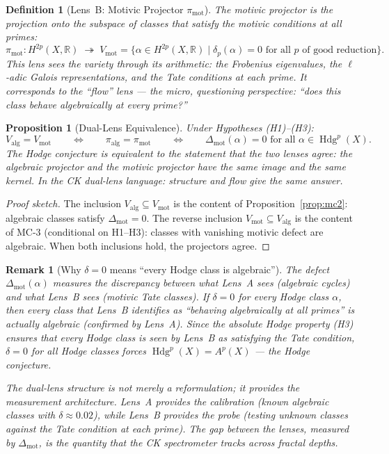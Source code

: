 \documentclass[11pt]{article}
\newtheorem{proposition}[theorem]{Proposition}
\newtheorem{definition}[theorem]{Definition}
\newtheorem{remark}[theorem]{Remark}
\theoremstyle{definition}
\DeclareMathOperator{\Hdg}{Hdg}
\begin{document}
\begin{definition}[Lens~B: Motivic Projector $\pi_{\mathrm{mot}}$]
\label{def:lens-B}
The \emph{motivic projector} is the projection onto the subspace of classes
that satisfy the motivic conditions at all primes:
\[
  \pi_{\mathrm{mot}} : H^{2p}(X, \mathbb{R})
  \;\twoheadrightarrow\;
  V_{\mathrm{mot}} = \bigl\{
    \alpha \in H^{2p}(X, \mathbb{R})
    \;\big|\;
    \delta_p(\alpha) = 0 \text{ for all } p \text{ of good reduction}
  \bigr\}.
\]
This lens sees the variety through its arithmetic: the Frobenius eigenvalues,
the $\ell$-adic Galois representations, and the Tate conditions at each
prime.  It corresponds to the ``flow'' lens --- the micro, questioning
perspective: ``does this class \emph{behave} algebraically at every prime?''
\end{definition}

\begin{proposition}[Dual-Lens Equivalence]
\label{prop:dual-lens-equiv}
Under Hypotheses (H1)--(H3):
\[
  V_{\mathrm{alg}} = V_{\mathrm{mot}}
  \qquad\Longleftrightarrow\qquad
  \pi_{\mathrm{alg}} = \pi_{\mathrm{mot}}
  \qquad\Longleftrightarrow\qquad
  \Delta_{\mathrm{mot}}(\alpha) = 0
  \text{ for all } \alpha \in \Hdg^p(X).
\]
The Hodge conjecture is equivalent to the statement that the two lenses
agree: the algebraic projector and the motivic projector have the same
image and the same kernel.  In the CK dual-lens language: structure and
flow give the same answer.
\end{proposition}

\begin{proof}[Proof sketch]
The inclusion $V_{\mathrm{alg}} \subseteq V_{\mathrm{mot}}$ is the
content of Proposition~\ref{prop:mc2}: algebraic classes satisfy
$\Delta_{\mathrm{mot}} = 0$.  The reverse inclusion
$V_{\mathrm{mot}} \subseteq V_{\mathrm{alg}}$ is the content of
MC-3 (conditional on H1--H3): classes with vanishing motivic defect
are algebraic.  When both inclusions hold, the projectors agree.
\end{proof}

\begin{remark}[Why $\delta = 0$ means ``every Hodge class is algebraic'']
The defect $\Delta_{\mathrm{mot}}(\alpha)$ measures the discrepancy
between what Lens~A sees (algebraic cycles) and what Lens~B sees (motivic
Tate classes).  If $\delta = 0$ for every Hodge class $\alpha$, then
every class that Lens~B identifies as ``behaving algebraically at all
primes'' is actually algebraic (confirmed by Lens~A).  Since the absolute
Hodge property (H3) ensures that every Hodge class is seen by Lens~B as
satisfying the Tate condition, $\delta = 0$ for all Hodge classes forces
$\Hdg^p(X) = A^p(X)$ --- the Hodge conjecture.

The dual-lens structure is not merely a reformulation; it provides the
measurement architecture.  Lens~A provides the calibration (known algebraic
classes with $\delta \approx 0.02$), while Lens~B provides the probe
(testing unknown classes against the Tate condition at each prime).
The gap between the lenses, measured by $\Delta_{\mathrm{mot}}$, is the
quantity that the CK spectrometer tracks across fractal depths.
\end{remark}
\end{document}
